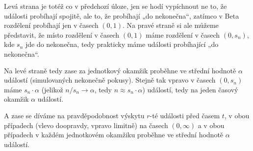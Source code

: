 \documentclass[12pt]{article}					%
\begin{document}
\begin{priklad}[2.3]
	\begin{reseni}[Interpretace]
		Levá strana je totéž co v předchozí úloze, jen se hodí vypíchnout ne to, že události probíhají spojitě, ale to, že probíhají „do nekonečna“, zatímco v Beta rozdělení probíhají jen v časech $(0, 1)$. Na pravé straně si ale můžeme představit, že místo rozdělení v časech $(0, 1)$ máme rozdělení v časech $(0, s_n)$, kde $s_n$ jde do nekonečna, tedy prakticky máme události probíhající „do nekonečna“.

		Na levé straně tedy zase za jednotkový okamžik proběhne ve střední hodnotě $\alpha$ událostí (simulovaných nekonečně pokusy). Stejně tak vpravo v časech $(0, s_n)$ máme $s_n·\alpha$ (jelikož $n / s_n \rightarrow \alpha$, tedy $n \approx s_n · \alpha$) událostí, tedy na jeden časový okamžik $\alpha$ událostí.

		A zase se díváme na pravděpodobnost výskytu $r$-té události před časem $t$, v obou případech (vlevo doopravdy, vpravo limitně) na časech $(0, ∞)$ a v obou případech v každém jednotkovém okamžiku proběhne ve střední hodnotě $\alpha$ událostí.
	\end{reseni}
\end{priklad}
\end{document}

